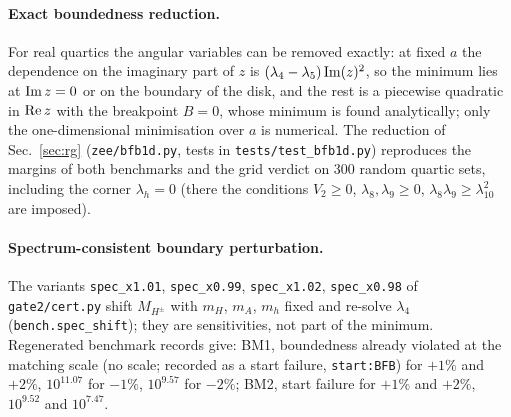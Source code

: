 \documentclass[twocolumn,epjc3]{svjour3}
\begin{document}
\paragraph{Exact boundedness reduction.} For real quartics the angular variables can be removed exactly: at fixed $a$ the dependence on the imaginary part of $z$ is $(\lambda_4-\lambda_5)\,{\rm Im}(z)^2$, so the minimum lies at ${\rm Im}\,z=0$ or on the boundary of the disk, and the rest is a piecewise quadratic in ${\rm Re}\,z$ with the breakpoint $B=0$, whose minimum is found analytically; only the one-dimensional minimisation over $a$ is numerical. The reduction of Sec.~\ref{sec:rg} (\texttt{zee/bfb1d.py}, tests in \texttt{tests/test\_bfb1d.py}) reproduces the margins of both benchmarks and the grid verdict on $300$ random quartic sets, including the corner $\lambda_h=0$ (there the conditions $V_2\ge0$, $\lambda_8,\lambda_9\ge0$, $\lambda_8\lambda_9\ge\lambda_{10}^2$ are imposed).

\paragraph{Spectrum-consistent boundary perturbation.} The variants \texttt{spec\_x1.01}, \texttt{spec\_x0.99}, \texttt{spec\_x1.02}, \texttt{spec\_x0.98} of \texttt{gate2/cert.py} shift $M_{H^\pm}$ with $m_H$, $m_A$, $m_h$ fixed and re-solve $\lambda_4$ (\texttt{bench.spec\_shift}); they are sensitivities, not part of the minimum. Regenerated benchmark records give: BM1, boundedness already violated at the matching scale (no scale; recorded as a start failure, \texttt{start:BFB}) for $+1\%$ and $+2\%$, $10^{11.07}$ for $-1\%$, $10^{9.57}$ for $-2\%$; BM2, start failure for $+1\%$ and $+2\%$, $10^{9.52}$ and $10^{7.47}$.
\end{document}
